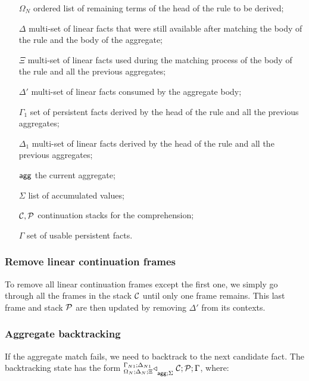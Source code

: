 \begin{enumerate}
   \item[$\Omega_N$] ordered list of remaining terms of the head of the rule to
   be derived;
   \item[$\Delta$] multi-set of linear facts that were still available after
   matching the body of the rule and the body of the aggregate;
   \item[$\Xi$] multi-set of linear facts used during the matching process of
   the body of the rule and all the previous aggregates;
   \item[$\Delta'$] multi-set of linear facts consumed by the aggregate body;
   \item[$\Gamma_{1}$] set of persistent facts derived by the head of the rule
   and all the previous aggregates;
   \item[$\Delta_{1}$] multi-set of linear facts derived by the head of the
   rule and all the previous aggregates;
   \item[$\mathsf{agg}$] the current aggregate;
   \item[$\Sigma$] list of accumulated values;
   \item[$\mathcal{C}, \mathcal{P}$] continuation stacks for the comprehension;
   \item[$\Gamma$] set of usable persistent facts.
\end{enumerate}

\subsubsection{Remove linear continuation frames}

To remove all linear continuation frames except the first one, we simply go
through all the frames in the stack $\mathcal{C}$ until only one frame remains.
This last frame and stack $\mathcal{P}$ are then updated by removing $\Delta'$
from its contexts.



\subsubsection{Aggregate backtracking}

If the aggregate match fails, we need to backtrack to the next candidate fact.
The backtracking state 
has the form
${{}^{\Gamma_{N1}; \Delta_{N1}}_{\Omega_N ; \Delta_N ; \Xi}\triangleleft}_{\mathsf{agg} ; \Sigma} \; \mathcal{C} ; \mathcal{P} ; \Gamma$, where:

